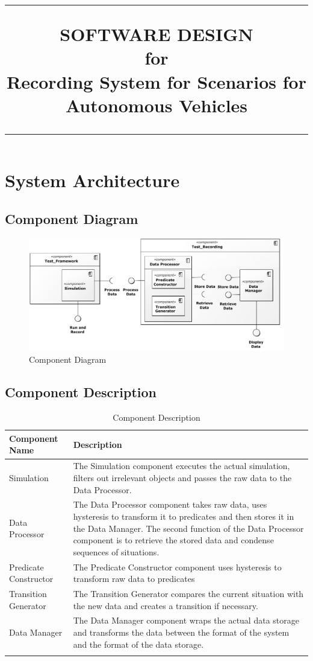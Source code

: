 \documentclass[a4paper, 11pt]{scrreprt}
\title{%
\flushright
\rule{16cm}{5pt}\vskip1cm
\Huge{SOFTWARE DESIGN}\\
\vspace{2cm}
for\\
\vspace{2cm}
Recording System for Scenarios for Autonomous Vehicles\\
\vfill
\rule{16cm}{5pt}
}
\date{}
\begin{document}
	\maketitle
	\tableofcontents
	
	\chapter{System Architecture}
	\section{Component Diagram}
		
		\begin{figure}[H]
			\includegraphics[width=\textwidth]{ComponentDiagram}
			\caption{Component Diagram}
		\end{figure}
	
	\section{Component Description}
	
		\begin{longtabu}{|X[-1,m]|X[l,m]|}
			\hline
			\rowfont[l]{\bfseries} Component Name & Description \\ \hline
			Simulation & The Simulation component executes the actual simulation, filters out irrelevant objects and passes the raw data to the Data Processor.\\ \hline
			Data Processor & The Data Processor component takes raw data, uses hysteresis to transform it to predicates and then stores it in the Data Manager. The second function of the Data Processor component is to retrieve the stored data and condense sequences of situations.\\ \hline
			Predicate Constructor & The Predicate Constructor component uses hysteresis to transform raw data to predicates\\ \hline
			Transition Generator & The Transition Generator compares the current situation with the new data and creates a transition if necessary.\\ \hline
			Data Manager & The Data Manager component wraps the actual data storage and transforms the data between the format of the system and the format of the data storage.\\ \hline
			\caption{Component Description}
		\end{longtabu}
	
\end{document}
